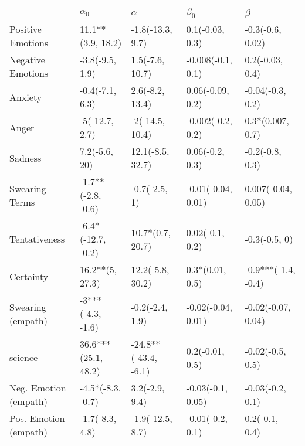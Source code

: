 \begin{tabular}{lllll}
\toprule
{} &           $\alpha_0$ &              $\alpha$ &           $\beta_0$ &              $\beta$ \\
\midrule
Positive Emotions     &    11.1**(3.9, 18.2) &      -1.8(-13.3, 9.7) &     0.1(-0.03, 0.3) &     -0.3(-0.6, 0.02) \\
Negative Emotions     &      -3.8(-9.5, 1.9) &       1.5(-7.6, 10.7) &   -0.008(-0.1, 0.1) &      0.2(-0.03, 0.4) \\
Anxiety               &      -0.4(-7.1, 6.3) &       2.6(-8.2, 13.4) &    0.06(-0.09, 0.2) &     -0.04(-0.3, 0.2) \\
Anger                 &       -5(-12.7, 2.7) &       -2(-14.5, 10.4) &   -0.002(-0.2, 0.2) &     0.3*(0.007, 0.7) \\
Sadness               &        7.2(-5.6, 20) &      12.1(-8.5, 32.7) &     0.06(-0.2, 0.3) &      -0.2(-0.8, 0.3) \\
Swearing Terms        &   -1.7**(-2.8, -0.6) &         -0.7(-2.5, 1) &  -0.01(-0.04, 0.01) &   0.007(-0.04, 0.05) \\
Tentativeness         &   -6.4*(-12.7, -0.2) &      10.7*(0.7, 20.7) &     0.02(-0.1, 0.2) &        -0.3(-0.5, 0) \\
Certainty             &      16.2**(5, 27.3) &      12.2(-5.8, 30.2) &     0.3*(0.01, 0.5) &  -0.9***(-1.4, -0.4) \\
Swearing (empath)     &    -3***(-4.3, -1.6) &       -0.2(-2.4, 1.9) &  -0.02(-0.04, 0.01) &   -0.02(-0.07, 0.04) \\
science               &  36.6***(25.1, 48.2) &  -24.8**(-43.4, -6.1) &     0.2(-0.01, 0.5) &     -0.02(-0.5, 0.5) \\
Neg. Emotion (empath) &    -4.5*(-8.3, -0.7) &        3.2(-2.9, 9.4) &   -0.03(-0.1, 0.05) &     -0.03(-0.2, 0.1) \\
Pos. Emotion (empath) &      -1.7(-8.3, 4.8) &      -1.9(-12.5, 8.7) &    -0.01(-0.2, 0.1) &       0.2(-0.1, 0.4) \\
\bottomrule
\end{tabular}

